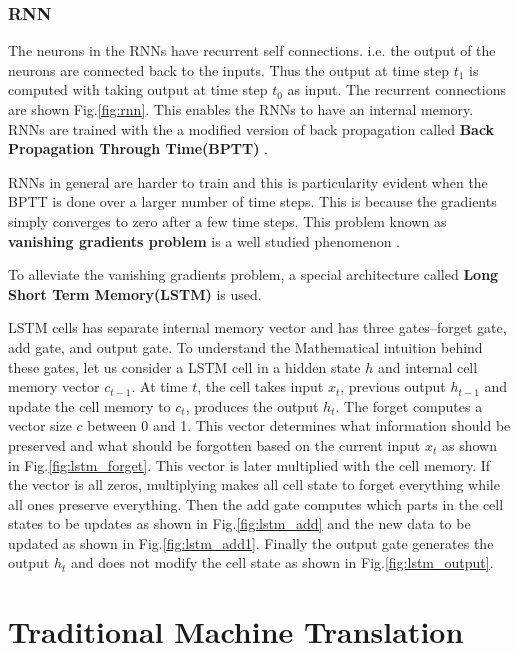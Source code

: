 \documentclass[a4paper]{article}
\begin{document}
\subsubsection{RNN}

The neurons  in the RNNs have recurrent self connections. i.e. the output of the
neurons  are connected back to the inputs. Thus the output at time step $t_1$ is
computed  with taking  output  at  time  step  $t_0$  as  input.  The  recurrent
connections  are  shown  Fig.\ref{fig:rnn}.  This  enables  the RNNs to have  an
internal  memory.  RNNs  are  trained  with  the  a  modified  version  of  back
propagation     called    \textbf{Back    Propagation     Through    Time(BPTT)}
\cite{werbos1990backpropagation}.

RNNs in general are harder  to train and this is particularity evident when  the
BPTT is done over a larger number of time  steps. This is because  the gradients
simply converges to  zero  after  a  few  time  steps.  This  problem  known  as
\textbf{vanishing   gradients   problem}   is   a    well   studied   phenomenon
\cite{bengio1994learning}.

To alleviate  the  vanishing  gradients problem,  a special  architecture called
\textbf{Long Short Term Memory(LSTM)} \cite{hochreiter1997long} is used.

LSTM cells has separate internal memory vector and has three gates--forget gate,
add gate, and output gate. To understand the Mathematical intuition behind these
gates,  let us consider  a LSTM cell in  a  hidden state  $h$  and internal cell
memory  vector $c_{t-1}$. At  time $t$, the cell  takes  input  $x_t$,  previous
output  $h_{t-1}$  and  update the  cell memory to $c_{t}$,  produces the output
$h_{t}$. The forget computes a vector  size $c$ between  0  and  1. This  vector
determines what  information should be  preserved  and  what  should be forgotten
based on the current input  $x_t$ as shown in Fig.\ref{fig:lstm_forget}. This vector
is  later  multiplied with  the  cell  memory.  If  the  vector  is  all  zeros,
multiplying makes all  cell  state to forget everything while all ones  preserve
everything.  Then  the add gate computes which  parts in  the cell  states to be
updates as shown in  Fig.\ref{fig:lstm_add} and the new  data to be updated as shown
in Fig.\ref{fig:lstm_add1}. Finally  the output gate generates the output  $h_t$ and
does not modify the cell state as shown in Fig.\ref{fig:lstm_output}.


\section{Traditional Machine Translation}
\end{document}
